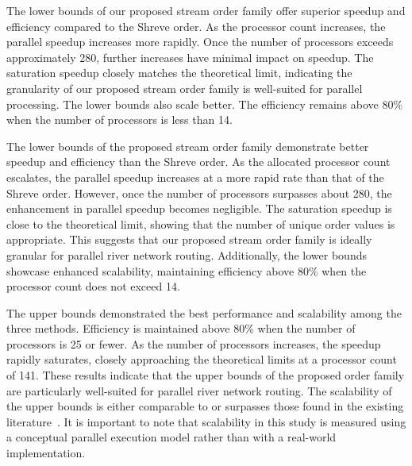 \documentclass[water,article,submit,pdftex,moreauthors]{Definitions/mdpi}
\begin{document}
The lower bounds of our proposed stream order family offer superior speedup and efficiency compared to the Shreve order. As the processor count increases, the parallel speedup increases more rapidly. Once the number of processors exceeds approximately 280, further increases have minimal impact on speedup. The saturation speedup closely matches the theoretical limit, indicating the granularity of our proposed stream order family is well-suited for parallel processing. The lower bounds also scale better. The efficiency remains above 80\% when the number of processors is less than 14.

The lower bounds of the proposed stream order family demonstrate better speedup and efficiency than the Shreve order. As the allocated processor count escalates, the parallel speedup increases at a more rapid rate than that of the Shreve order. However, once the number of processors surpasses about 280, the enhancement in parallel speedup becomes negligible. The saturation speedup is close to the theoretical limit, showing that the number of unique order values is appropriate. This suggests that our proposed stream order family is ideally granular for parallel river network routing. Additionally, the lower bounds showcase enhanced scalability, maintaining efficiency above 80\% when the processor count does not exceed 14.

The upper bounds demonstrated the best performance and scalability among the three methods. Efficiency is maintained above 80\% when the number of processors is 25 or fewer. As the number of processors increases, the speedup rapidly saturates, closely approaching the theoretical limits at a processor count of 141. These results indicate that the upper bounds of the proposed order family are particularly well-suited for parallel river network routing. The scalability of the upper bounds is either comparable to or surpasses those found in the existing literature~\cite{mizukami2021JAMES, liu2023JH}. It is important to note that scalability in this study is measured using a conceptual parallel execution model rather than with a real-world implementation.
\end{document}
